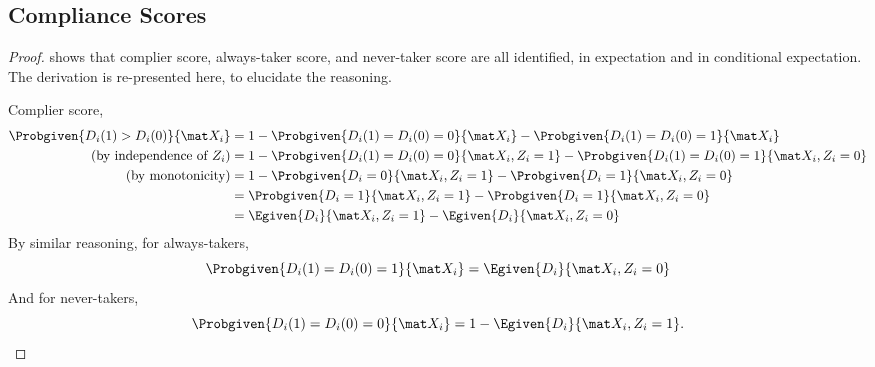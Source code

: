 \subsection{Compliance Scores}
\begin{proof}
    \label{proof:complierscore}
    \citet[Lemma~3.1]{abadie2003semiparametric} shows that complier score, always-taker score, and never-taker score are all identified, in expectation and in conditional expectation.
    The derivation is re-presented here, to elucidate the reasoning.

    Complier score,
    \begin{align*}
        \Probgiven{D_i(1) > D_i(0)}{\mat X_i}
            &= 1 - \Probgiven{D_i(1) = D_i(0) = 0}{\mat X_i} - \Probgiven{D_i(1) = D_i(0) = 1}{\mat X_i} \\
            \text{(by independence of $Z_i$)} &=
                1 - \Probgiven{D_i(1) = D_i(0) = 0}{\mat X_i, Z_i = 1} - \Probgiven{D_i(1) = D_i(0) = 1}{\mat X_i, Z_i = 0} \\
            \text{(by monotonicity)} &=
                1 - \Probgiven{D_i = 0}{\mat X_i, Z_i = 1} - \Probgiven{D_i = 1}{\mat X_i, Z_i = 0} \\
            &= \Probgiven{D_i = 1}{\mat X_i, Z_i = 1} - \Probgiven{D_i = 1}{\mat X_i, Z_i = 0} \\
            &= \Egiven{D_i}{\mat X_i, Z_i = 1} - \Egiven{D_i}{\mat X_i, Z_i = 0} \\
    \end{align*}
    By similar reasoning, for always-takers,
    \[ \Probgiven{D_i(1) = D_i(0) = 1}{\mat X_i} = \Egiven{D_i}{\mat X_i, Z_i = 0} \]
    And for never-takers,
    \[ \Probgiven{D_i(1) = D_i(0) = 0}{\mat X_i} = 1 - \Egiven{D_i}{\mat X_i, Z_i = 1}. \]
\end{proof}


